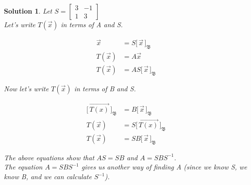 \documentclass{article}
\newtheorem*{solution}{Solution}
\newcommand{\Coord}[2]{\Bigg[ \, \vec{#1} \, \Bigg]_{\mathfrak{#2}}}
\begin{document}
\begin{solution}
Let $S = \begin{bmatrix} 3 & -1 \\ 1 & 3 \end{bmatrix}$ \\

Let's write $T(\vec{x})$ in terms of A and S.

\begin{align*}
\vec{x} &= S \Coord{x}{B} \\
T(\vec{x}) &= A \vec{x} \\
T(\vec{x}) &= A S \Coord{x}{B} 
\end{align*}

Now let's write $T(\vec{x})$ in terms of B and S.

\begin{align*}
\Coord{T(x)}{B} &= B\Coord{x}{B} \\
T(\vec{x}) &= S \Coord{T(x)}{B}  \\
T(\vec{x}) &= S B\Coord{x}{B}
\end{align*}

The above equations show that $AS = SB$ and $A = SBS^{-1}$. \\

The equation $A = SBS^{-1}$ gives us another way of finding A (since we know S, we know B, and we can calculate $S^{-1}$).

\end{solution}
\end{document}

